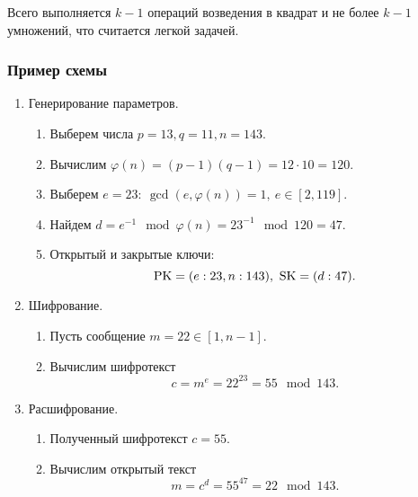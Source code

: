 Всего выполняется  $k-1$ операций возведения в квадрат и не более $k-1$ умножений, что считается легкой задачей.


\subsubsection{Пример схемы}

\begin{enumerate}
    \item Генерирование параметров.
        \begin{enumerate}
            \item Выберем числа $p=13, q=11, n = 143$.
            \item Вычислим $\varphi(n) = (p-1)(q-1) = 12 \cdot 10 = 120$.
            \item Выберем $e=23: ~ \gcd(e, \varphi(n))=1, ~ e \in [2, 119]$.
            \item Найдем $d = e^{-1} \mod \varphi(n) = 23^{-1} \mod 120 = 47$.
            \item Открытый и закрытые ключи:
                \[ \textrm{PK} = (e:23, n:143), ~ \textrm{SK} = (d:47). \]
        \end{enumerate}
    \item Шифрование.
        \begin{enumerate}
            \item Пусть сообщение $m = 22 \in [1, n-1]$.
            \item Вычислим шифротекст
                \[ c = m^e = 22^{23} = 55 \mod 143. \]
        \end{enumerate}
    \item Расшифрование.
        \begin{enumerate}
            \item Полученный шифротекст $c = 55$.
            \item Вычислим открытый текст
                \[ m = c^d = 55^{47} = 22 \mod 143. \]
        \end{enumerate}
\end{enumerate}



